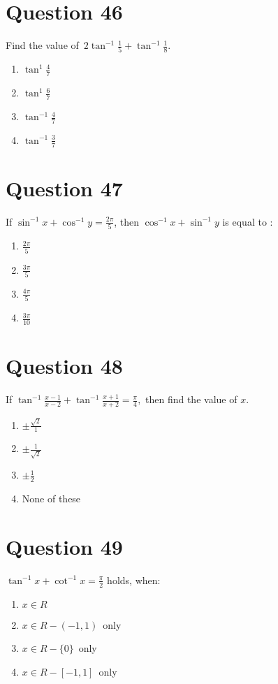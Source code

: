 \documentclass{article}
\begin{document}
\section*{Question 46}
Find the value of \(2 \tan ^{-1} \frac{1}{5}+\tan ^{-1} \frac{1}{8}\).\newline
\begin{enumerate}[label=(\alph*)]
\item \(\tan ^{1} \frac{4}{7}\)
\item \(\tan ^{1} \frac{6}{7}\)
\item \(\tan ^{-1} \frac{4}{7}\)
\item \(\tan ^{-1} \frac{3}{7}\)
\end{enumerate}
\newpage
\section*{Question 47}
If \(\sin ^{-1} {x}+\cos ^{-1} {y}=\frac{2 \pi}{5}\), then \(\cos ^{-1} {x}+\sin ^{-1} {y}\) is equal to :
\begin{enumerate}[label=(\alph*)]
\item \(\frac{2 \pi}{5}\)
\item \(\frac{3 \pi}{5}\)
\item \(\frac{4 \pi}{5}\)
\item \(\frac{3 \pi}{10}\)
\end{enumerate}
\newpage
\section*{Question 48}
If \(\tan ^{-1} \frac{x-1}{x-2}+\tan ^{-1} \frac{x+1}{x+2}=\frac{\pi}{4},\) then find the value of \(x\).
\begin{enumerate}[label=(\alph*)]
\item \(\pm \frac{\sqrt{2}}{1}\)
\item \(\pm \frac{1}{\sqrt{2}}\)
\item \(\pm \frac{1}{2}\)
\item None of these
\end{enumerate}
\newpage
\section*{Question 49}
\(\tan ^{-1} x+\cot ^{-1} x=\frac{\pi}{2}\) holds, when:
\begin{enumerate}[label=(\alph*)]
\item \(x \in R\)
\item \(x \in R-(-1,1)\) only
\item \(x \in R-\{0\}\) only
\item \(x \in R-[-1,1]\) only
\end{enumerate}
\newpage
\end{document}
